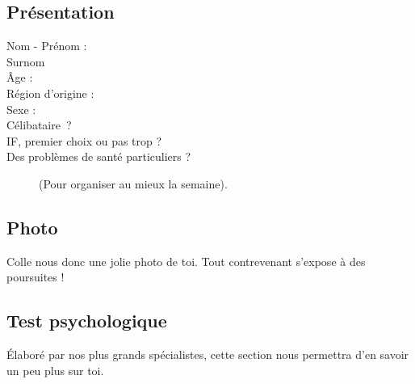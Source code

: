 \subsection*{Présentation}
\begin{description}
    \item[Nom - Prénom :]
    \item[Surnom]
    \item[Âge :]
    \item[Région d'origine :]
    \item[Sexe :]
    \item[Célibataire~?]
    \item[IF, premier choix ou pas trop ?]
    \item[Des problèmes de santé particuliers ?] (Pour organiser au mieux la
	    semaine).
\end{description}
\subsection*{Photo}
Colle nous donc une jolie photo de toi. Tout contrevenant s'expose à des
poursuites !
\vspace{3cm}

\subsection*{Test psychologique}
Élaboré par nos plus grands spécialistes, cette section nous permettra d'en
savoir un peu plus sur toi.

